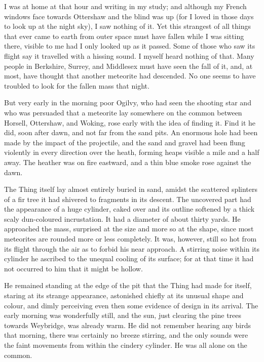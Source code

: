 I was at home at that hour and writing in my study; and although my
French windows face towards Ottershaw and the blind was up (for I
loved in those days to look up at the night sky), I saw nothing of
it. Yet this strangest of all things that ever came to earth from
outer space must have fallen while I was sitting there, visible to
me had I only looked up as it passed. Some of those who saw its
flight say it travelled with a hissing sound. I myself heard
nothing of that. Many people in Berkshire, Surrey, and Middlesex
must have seen the fall of it, and, at most, have thought that
another meteorite had descended. No one seems to have troubled to
look for the fallen mass that night.

But very early in the morning poor Ogilvy, who had seen the
shooting star and who was persuaded that a meteorite lay somewhere
on the common between Horsell, Ottershaw, and Woking, rose early
with the idea of finding it. Find it he did, soon after dawn, and
not far from the sand pits. An enormous hole had been made by the
impact of the projectile, and the sand and gravel had been flung
violently in every direction over the heath, forming heaps visible
a mile and a half away. The heather was on fire eastward, and a
thin blue smoke rose against the dawn.

The Thing itself lay almost entirely buried in sand, amidst the
scattered splinters of a fir tree it had shivered to fragments in
its descent. The uncovered part had the appearance of a huge
cylinder, caked over and its outline softened by a thick scaly
dun-coloured incrustation. It had a diameter of about thirty yards.
He approached the mass, surprised at the size and more so at the
shape, since most meteorites are rounded more or less completely.
It was, however, still so hot from its flight through the air as to
forbid his near approach. A stirring noise within its cylinder he
ascribed to the unequal cooling of its surface; for at that time it
had not occurred to him that it might be hollow.

He remained standing at the edge of the pit that the Thing had made
for itself, staring at its strange appearance, astonished chiefly
at its unusual shape and colour, and dimly perceiving even then
some evidence of design in its arrival. The early morning was
wonderfully still, and the sun, just clearing the pine trees
towards Weybridge, was already warm. He did not remember hearing
any birds that morning, there was certainly no breeze stirring, and
the only sounds were the faint movements from within the cindery
cylinder. He was all alone on the common.

